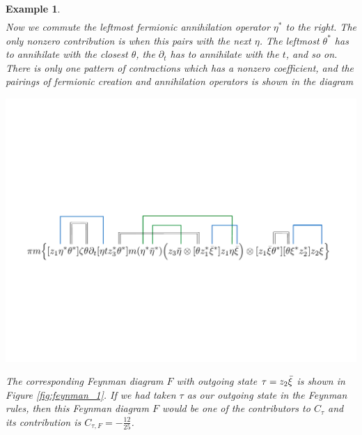 \documentclass[english,letter paper,12pt,leqno]{article}
\theoremstyle{example}
\newtheorem{example}[theorem]{Example}
\numberwithin{equation}{section}
\begin{document}
\begin{example}
\begin{gather*}
\end{gather*}
Now we commute the leftmost fermionic annihilation operator $\eta^*$ to the right. The only nonzero contribution is when this pairs with the next $\eta$. The leftmost $\theta^*$ has to annihilate with the closest $\theta$, the $\partial_t$ has to annihilate with the $t$, and so on. There is only one pattern of contractions which has a nonzero coefficient, and the pairings of fermionic creation and annihilation operators is shown in the diagram
\begin{center}
\includegraphics[scale=0.45]{dia22}
\end{center}
The corresponding Feynman diagram $F$ with outgoing state $\tau = z_2 \Bar{\xi}$ is shown in Figure \ref{fig:feynman_1}. If we had taken $\tau$ as our outgoing state in the Feynman rules, then this Feynman diagram $F$ would be one of the contributors to $C_{\tau}$ and its contribution is $C_{\tau, F} = - \tfrac{12}{25}$.


\end{example}
\end{document}
